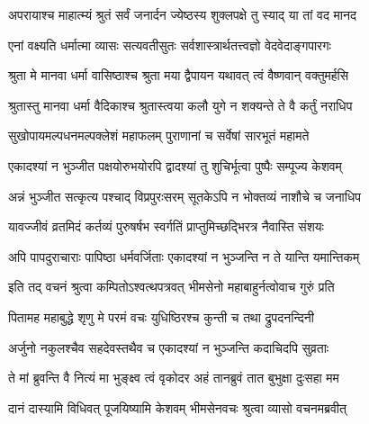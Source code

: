 \label{sec:padma-jyeshtha-shukla-nirjala}

\ganapatyadiDhyanam
\padmaPuranam



\twolineshloka
{अपरायाश्च माहात्म्यं श्रुतं सर्वं जनार्दन}
{ज्येष्ठस्य शुक्लपक्षे तु स्याद् या तां वद मानद}%


\twolineshloka
{एनां वक्ष्यति धर्मात्मा व्यासः सत्यवतीसुतः}
{सर्वशास्त्रार्थतत्त्वज्ञो वेदवेदाङ्गपारगः}%


\twolineshloka
{श्रुता मे मानवा धर्मा वासिष्ठाश्च श्रुता मया}
{द्वैपायन यथावत् त्वं वैष्णवान् वक्तुमर्हसि}%


\twolineshloka
{श्रुतास्तु मानवा धर्मा वैदिकाश्च श्रुतास्त्वया}
{कलौ युगे न शक्यन्ते ते वै कर्तुं नराधिप}%

\twolineshloka
{सुखोपायमल्पधनमल्पक्लेशं महाफलम्}
{पुराणानां च सर्वेषां सारभूतं महामते}%

\twolineshloka
{एकादश्यां न भुञ्जीत पक्षयोरुभयोरपि}
{द्वादश्यां तु शुचिर्भूत्वा पुष्पैः सम्पूज्य केशवम्}%

\twolineshloka
{अन्नं भुञ्जीत सत्कृत्य पश्चाद् विप्रपुरःसरम्}
{सूतकेऽपि न भोक्तव्यं नाशौचे च जनाधिप}%

\twolineshloka
{यावज्जीवं व्रतमिदं कर्तव्यं पुरुषर्षभ}
{स्वर्गतिं प्राप्तुमिच्छद्भिरत्र नैवास्ति संशयः}%

\twolineshloka
{अपि पापदुराचाराः पापिष्ठा धर्मवर्जिताः}
{एकादश्यां न भुञ्जन्ति न ते यान्ति यमान्तिकम्}%

\twolineshloka
{इति तद् वचनं श्रुत्वा कम्पितोऽश्वत्थपत्रवत्}
{भीमसेनो महाबाहुर्नत्वोवाच गुरुं प्रति}%


\twolineshloka
{पितामह महाबुद्धे शृणु मे परमं वचः}
{युधिष्ठिरश्च कुन्ती च तथा द्रुपदनन्दिनी}%

\twolineshloka
{अर्जुनो नकुलश्चैव सहदेवस्तथैव च}
{एकादश्यां न भुञ्जन्ति कदाचिदपि सुव्रताः}%

\twolineshloka
{ते मां ब्रुवन्ति वै नित्यं मा भुङ्क्ष्व त्वं वृकोदर}
{अहं तानब्रुवं तात बुभुक्षा दुःसहा मम}%

\twolineshloka
{दानं दास्यामि विधिवत् पूजयिष्यामि केशवम्}
{भीमसेनवचः श्रुत्वा व्यासो वचनमब्रवीत्}%

